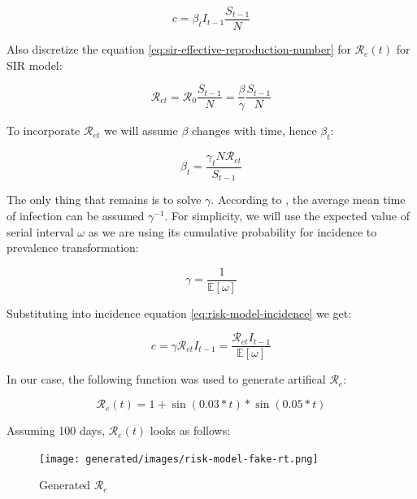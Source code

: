 \documentclass[
  digital, %
  oneside, %
  lof,     %
  lot,     %
]{fithesis4}
\begin{document}
\begin{equation}
  \label{eq:risk-model-incidence}
  c = \beta_t I_{t-1} \frac{S_{t-1}}{N}
\end{equation}

Also discretize the equation \eqref{eq:sir-effective-reproduction-number} for $\mathcal{R}_e(t)$ for SIR model:

\begin{equation}\label{eq:risk-model-rt}
  \mathcal{R}_{et} = \mathcal{R}_0 \frac{S_{t-1}}{N} = \frac{\beta}{\gamma} \frac{S_{t-1}}{N}
\end{equation}

To incorporate $\mathcal{R}_{et}$ we will assume $\beta$ changes with time, hence $\beta_t$:

\begin{equation}
\beta_t = \frac{\gamma_t N \mathcal{R}_{et}}{S_{t-1}}
\end{equation}

The only thing that remains is to solve $\gamma$. According to \cite{ma2019}, the average mean time of infection can be assumed $\gamma^{-1}$.
For simplicity, we will use the expected value of serial interval $\omega$ as we are using its cumulative probability for incidence to prevalence transformation:

\begin{equation}
  \gamma = \frac{1}{\mathbb{E}[\omega]}
\end{equation}

Substituting into incidence equation \eqref{eq:risk-model-incidence} we get:

\begin{equation}
  c = \gamma \mathcal{R}_{et} I_{t-1} = \frac{\mathcal{R}_{et} I_{t-1}}{\mathbb{E}[\omega]}
\end{equation}

In our case, the following function was used to generate artifical $\mathcal{R}_{e}$:

\begin{equation}
  \mathcal{R}_{e}(t) = 1 + \sin (0.03 * t) * \sin (0.05 * t)
\end{equation}

Assuming 100 days, $\mathcal{R}_{e}(t)$ looks as follows:

\begin{figure}[H]
  \begin{center}
    \texttt{[image: generated/images/risk-model-fake-rt.png]}
  \end{center}
  \caption{Generated $\mathcal{R}_{e}$}
  \label{fig:risk-model-fake-rt}
\end{figure}
\end{document}
